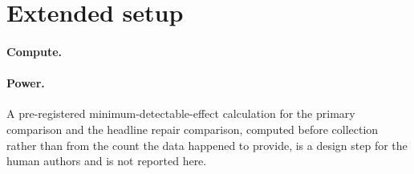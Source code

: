 \documentclass{article}
\newif\ifredflags
\newcommand{\rf}[1]{\ifredflags{\textcolor{red}{\textbf{[MISSING: #1]}}}\fi}
\begin{document}
\section{Extended setup}
\label{app:setup}

\paragraph{Compute.} \rf{hardware, total GPU-hours, and quantization details for every run. Nothing
about compute appears in the paper, and ICLR reviewers ask.} \rf{the license of each released
artifact (the released query sets, the code) and the license terms of the Wikidata, MuSiQue and 2WikiMultiHopQA
sources it derives from.}

\paragraph{Power.} A pre-registered minimum-detectable-effect calculation for the primary comparison
and the headline repair comparison, computed before collection rather than from the count the data
happened to provide, is a design step for the human authors and is not reported here.
\rf{the class balance of the held-out composed set. Every AUROC against $Y$ in
Tables~\ref{tab:bgr} and \ref{tab:bgr-full} is computed on $n{=}239$ items whose positive/negative
split is never stated; the control (n) figures imply roughly 40 incorrect items, which would put wide
intervals on all thirteen baselines and on both BGR variants.} \rf{bootstrap confidence intervals on
every cell of Tables~\ref{tab:gap}, \ref{tab:bgr} and \ref{tab:bgr-full}. Only the positive control
currently carries intervals, so no comparison other than BGR-versus-surface-gate has an uncertainty
estimate.}
\end{document}
